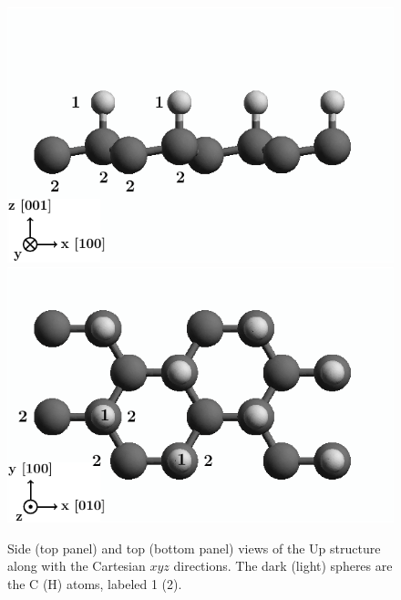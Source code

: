 \documentclass[prb,11pt,tightenlines,twocolumn,aps]{revtex4-1}
\begin{document}
\begin{figure}[ht!]
    \centering
    \includegraphics[width=\linewidth]{figures/upstruc2}
    \\
    \includegraphics[width=\linewidth]{figures/upstruc1}
    \caption{Side (top panel) and top (bottom panel) views of the Up
      structure along with the 
      Cartesian $xyz$ directions. The dark (light) spheres are the C (H) atoms,
      labeled 1 (2).
}
    \label{fig:up-struc}
\end{figure}
\end{document}
